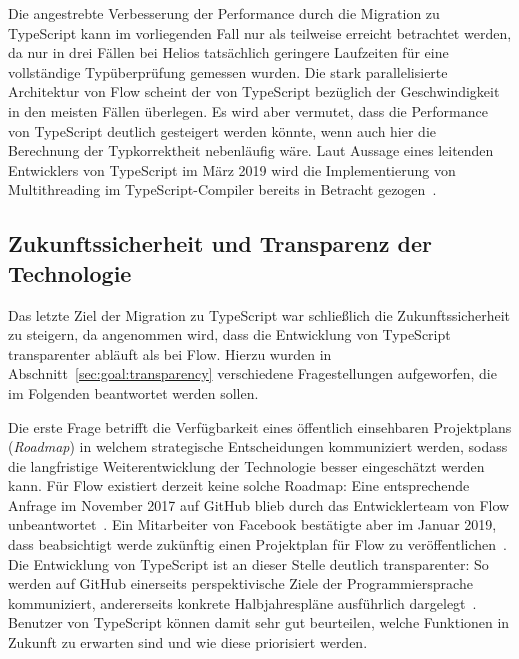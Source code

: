 Die angestrebte Verbesserung der Performance durch die Migration zu TypeScript kann im vorliegenden Fall nur als teilweise erreicht betrachtet werden, da nur in drei Fällen bei Helios tatsächlich geringere Laufzeiten für eine vollständige Typüberprüfung gemessen wurden. Die stark parallelisierte Architektur von Flow scheint der von TypeScript bezüglich der Geschwindigkeit in den meisten Fällen überlegen. Es wird aber vermutet, dass die Performance von TypeScript deutlich gesteigert werden könnte, wenn auch hier die Berechnung der Typkorrektheit nebenläufig wäre. Laut Aussage eines leitenden Entwicklers von TypeScript im März 2019 wird die Implementierung von Multithreading im TypeScript-Compiler bereits in Betracht gezogen~\autocite{TS:MULTICORE}.

\subsection{Zukunftssicherheit und Transparenz der Technologie}

Das letzte Ziel der Migration zu TypeScript war schließlich die Zukunftssicherheit zu steigern, da angenommen wird, dass die Entwicklung von TypeScript transparenter abläuft als bei Flow. Hierzu wurden in Abschnitt~\ref{sec:goal:transparency} verschiedene Fragestellungen aufgeworfen, die im Folgenden beantwortet werden sollen.

Die erste Frage betrifft die Verfügbarkeit eines öffentlich einsehbaren Projektplans (\textit{Roadmap}) in welchem strategische Entscheidungen kommuniziert werden, sodass die langfristige Weiterentwicklung der Technologie besser eingeschätzt werden kann. Für Flow existiert derzeit keine solche Roadmap: Eine entsprechende Anfrage im November 2017 auf GitHub blieb durch das Entwicklerteam von Flow unbeantwortet~\autocite{FLOW:GITHUB:ROADMAP}. Ein Mitarbeiter von Facebook bestätigte aber im Januar 2019, dass beabsichtigt werde zukünftig einen Projektplan für Flow zu veröffentlichen~\autocite{FLOW:GITHUB:ROADMAP_FUTURE}. Die Entwicklung von TypeScript ist an dieser Stelle deutlich transparenter: So werden auf GitHub einerseits perspektivische Ziele der Programmiersprache kommuniziert, andererseits konkrete Halbjahrespläne ausführlich dargelegt~\autocite{TS:ROADMAP}. Benutzer von TypeScript können damit sehr gut beurteilen, welche Funktionen in Zukunft zu erwarten sind und wie diese priorisiert werden.

